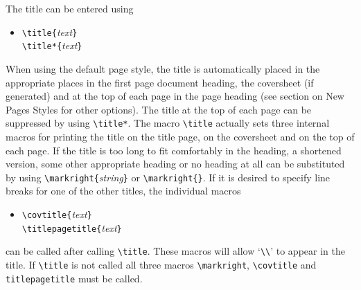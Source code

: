 The title can be entered using
\begin{itemize}
\item[]
\verb|\title{|{\it text}\verb|}|\\
\verb|\title*{|{\it text}\verb|}|
\end{itemize}
When using the default page style, the title is automatically placed
in the appropriate places in the first page document heading, the
coversheet (if generated) and at the top of each page in the page
heading (see section on New Pages Styles for other options).  The
title at the top of each page can be suppressed by using
\verb|\title*|.  The
macro \verb|\title| actually sets three internal macros for printing
the title on the title page, on the coversheet and on the top of each
page.  If the title is too long to fit comfortably in the heading, a
shortened version, some other appropriate heading or no heading at all
can be substituted by using
\verb|\markright{|{\it string}\verb|}| or 
\verb|\markright{}|.  
If it is desired to specify line breaks for one of the other titles,
the individual macros 
\begin{itemize}
\item[]
\verb|\covtitle{|{\it text}\verb|}|\\
\verb|\titlepagetitle{|{\it text}\verb|}|
\end{itemize}
can be called after calling \verb|\title|.  These macros will allow
`\verb|\\|' to appear in the title.  If \verb|\title| is not called
all three macros \verb|\markright|, \verb|\covtitle| and
\verb|titlepagetitle| must be called.

